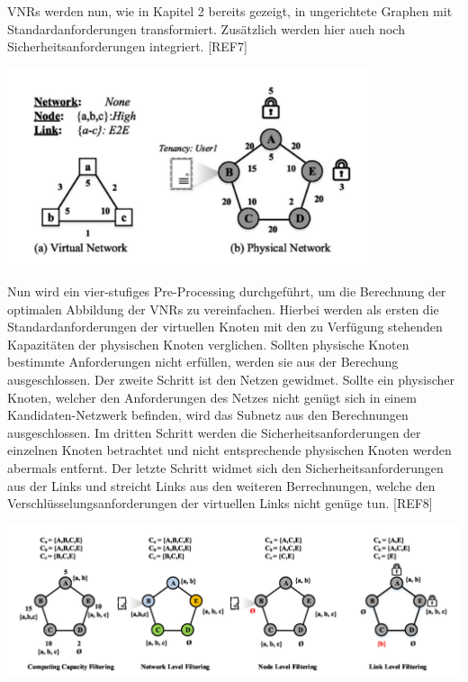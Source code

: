 \documentclass{lni}
\begin{document}
VNRs werden nun, wie in Kapitel 2 bereits gezeigt, in ungerichtete Graphen mit Standardanforderungen transformiert. Zusätzlich werden hier auch noch Sicherheitsanforderungen integriert. [REF7]\newline
\begin{center}
	\includegraphics[width=0.8\textwidth]{SVNR.pdf}\newline
\end{center}
Nun wird ein vier-stufiges Pre-Processing durchgeführt, um die Berechnung der optimalen Abbildung der VNRs zu vereinfachen. Hierbei werden als ersten die Standardanforderungen der virtuellen Knoten mit den zu Verfügung stehenden Kapazitäten der physischen Knoten verglichen. Sollten physische Knoten bestimmte Anforderungen nicht erfüllen, werden sie aus der Berechung ausgeschlossen. Der zweite Schritt ist den Netzen gewidmet. Sollte ein physischer Knoten, welcher den Anforderungen des Netzes nicht genügt sich in einem Kandidaten-Netzwerk befinden, wird das Subnetz aus den Berechnungen ausgeschlossen. Im dritten Schritt werden die Sicherheitsanforderungen der einzelnen Knoten betrachtet und nicht entsprechende physischen Knoten werden abermals entfernt. Der letzte Schritt widmet sich den Sicherheitsanforderungen aus der Links und streicht Links aus den weiteren Berrechnungen, welche den Verschlüsselungsanforderungen der virtuellen Links nicht genüge tun. [REF8]\newline
\begin{center}
	\includegraphics[width=1\textwidth]{pre-processing.pdf}\newline
\end{center}
\end{document}
